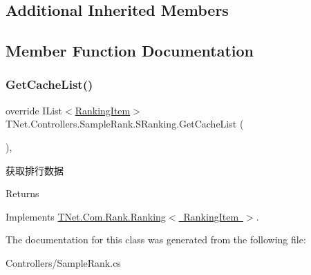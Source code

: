 \subsection*{Additional Inherited Members}


\subsection{Member Function Documentation}
\mbox{\label{class_t_net_1_1_controllers_1_1_sample_rank_1_1_s_ranking_a91a2f72ebdb7fef162dd51f25939e3db}} 
\subsubsection{\texorpdfstring{Get\+Cache\+List()}{GetCacheList()}}
{\footnotesize\ttfamily override I\+List$<$\mbox{\hyperlink{class_t_net_1_1_com_1_1_model_1_1_ranking_item}{Ranking\+Item}}$>$ T\+Net.\+Controllers.\+Sample\+Rank.\+S\+Ranking.\+Get\+Cache\+List (\begin{DoxyParamCaption}{ }\end{DoxyParamCaption})\hspace{0.3cm}{\ttfamily [protected]}, {\ttfamily [virtual]}}



获取排行数据 

\begin{DoxyReturn}{Returns}

\end{DoxyReturn}


Implements \mbox{\hyperlink{class_t_net_1_1_com_1_1_rank_1_1_ranking_ae0000a540fbbf11d5ca86eeff68423f3}{T\+Net.\+Com.\+Rank.\+Ranking$<$ Ranking\+Item $>$}}.



The documentation for this class was generated from the following file\+:\begin{DoxyCompactItemize}
\item 
Controllers/Sample\+Rank.\+cs\end{DoxyCompactItemize}
